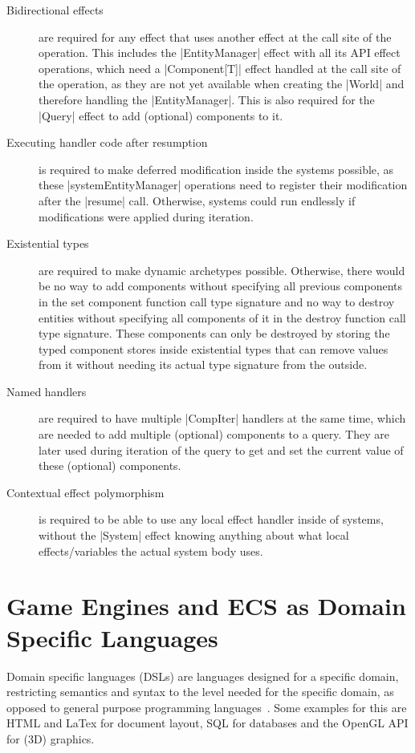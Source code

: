 \begin{description}
\item[Bidirectional effects] are required for any effect that uses another effect at the call site of the operation. This includes the |EntityManager| effect with all its API effect operations, which need a |Component[T]| effect handled at the call site of the operation, as they are not yet available when creating the |World| and therefore handling the |EntityManager|. This is also required for the |Query| effect to add (optional) components to it.
\item[Executing handler code after resumption] is required to make deferred modification inside the systems possible, as these |systemEntityManager| operations need to register their modification after the |resume| call. Otherwise, systems could run endlessly if modifications were applied during iteration.
\item[Existential types] are required to make dynamic archetypes possible. Otherwise, there would be no way to add components without specifying all previous components in the set component function call type signature and no way to destroy entities without specifying all components of it in the destroy function call type signature. These components can only be destroyed by storing the typed component stores inside existential types that can remove values from it without needing its actual type signature from the outside.
\item[Named handlers] are required to have multiple |CompIter| handlers at the same time, which are needed to add multiple (optional) components to a query. They are later used during iteration of the query to get and set the current value of these (optional) components.
\item[Contextual effect polymorphism] is required to be able to use any local effect handler inside of systems, without the |System| effect knowing anything about what local effects/variables the actual system body uses.
\end{description}

\section{Game Engines and ECS as Domain Specific Languages}

Domain specific languages (DSLs) are languages designed for a specific domain, restricting semantics and syntax to the level needed for the specific domain, as opposed to general purpose programming languages~\cite{hudak1997domain}. Some examples for this are HTML and LaTex for document layout, SQL for databases and the OpenGL API for (3D) graphics.

